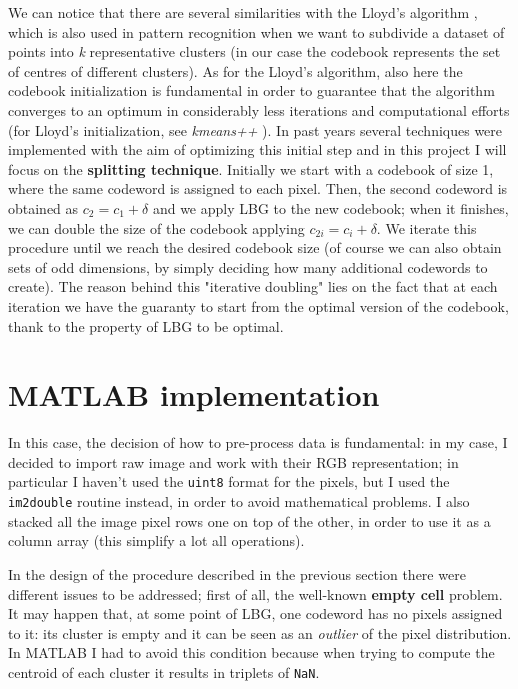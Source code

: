 \documentclass{article}
\def\code#1{\texttt{#1}}
\begin{document}
We can notice that there are several similarities with the Lloyd's algorithm \cite{Lloyd}, which is also used in pattern recognition when we want to subdivide a dataset of points into \textit{k} representative clusters (in our case the codebook represents the set of centres of different clusters). As for the Lloyd's algorithm, also here the codebook initialization is fundamental in order to guarantee that the algorithm converges to an optimum in considerably less iterations and computational efforts (for Lloyd's initialization, see \textit{kmeans++} \cite{kmeans++}). In past years several techniques were implemented with the aim of optimizing this initial step and in this project I will focus on the \textbf{splitting technique}. Initially we start with a codebook of size 1, where the same codeword is assigned to each pixel. Then, the second codeword is obtained as $ c_2 = c_1 + \delta$ and we apply LBG to the new codebook; when it finishes, we can double the size of the codebook applying $c_{2i} = c_i + \delta$. We iterate this procedure until we reach the desired codebook size (of course we can also obtain sets of odd dimensions, by simply deciding how many additional codewords to create). The reason behind this "iterative doubling" lies on the fact that at each iteration we have the guaranty to start from the optimal version of the codebook, thank to the property of LBG to be optimal.

\section{MATLAB implementation}

In this case, the decision of how to pre-process data is fundamental: in my case, I decided to import raw image and work with their RGB representation; in particular I haven't used the \code{uint8} format for the pixels, but I used the \code{im2double} routine instead, in order to avoid mathematical problems. I also stacked all the image pixel rows one on top of the other, in order to use it as a column array (this simplify a lot all operations).

In the design of the procedure described in the previous section there were different issues to be addressed; first of all, the well-known \textbf{empty cell} problem. It may happen that, at some point of LBG, one codeword has no pixels assigned to it: its cluster is empty and it can be seen as an \textit{outlier} of the pixel distribution. In MATLAB I had to avoid this condition because when trying to compute the centroid of each cluster it results in triplets of \code{NaN}.
\end{document}
